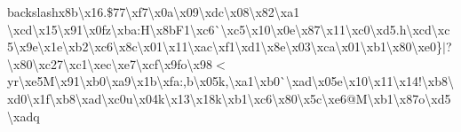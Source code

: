 \begin{DoxyCompactItemize}
backslash{}x8b\textbackslash{}x16.\$77\textbackslash{}xf7\textbackslash{}x0a\textbackslash{}x09\textbackslash{}xdc\textbackslash{}x08\textbackslash{}x82\textbackslash{}xa1 \textbackslash{}xcd\textbackslash{}x15\textbackslash{}x91\textbackslash{}x0fz\textbackslash{}xba\+:\+H\textbackslash{}x8b\+F1\textbackslash{}xc6\`{}\textbackslash{}xc5\textbackslash{}x10\textbackslash{}x0e\textbackslash{}x87\textbackslash{}x11\textbackslash{}xc0\textbackslash{}xd5.\+h\textbackslash{}xcd\textbackslash{}xc5\textbackslash{}x9e\textbackslash{}x1e\textbackslash{}xb2\textbackslash{}xc6\textbackslash{}x8c\textbackslash{}x01\textbackslash{}x11\textbackslash{}xac\textbackslash{}xf1\textbackslash{}xd1\textbackslash{}x8e\textbackslash{}x03\textbackslash{}xca\textbackslash{}x01\textbackslash{}xb1\textbackslash{}x80\textbackslash{}xe0\textquotesingle{}\}$\vert$?\textbackslash{}x80\textbackslash{}xc27\textbackslash{}xc1\textbackslash{}xec\textbackslash{}xe7\textbackslash{}xcf\textbackslash{}x9fo\textbackslash{}x98$<$yr\textbackslash{}xe5\+M\textbackslash{}x91\textbackslash{}xb0\textbackslash{}xa9\textbackslash{}x1b\textbackslash{}xfa\+:,b\textbackslash{}x05k,\textbackslash{}xa1\textbackslash{}xb0\`{}\textbackslash{}xad\textbackslash{}x05e\textbackslash{}x10\textbackslash{}x11\textbackslash{}x14!\textbackslash{}xb8\textbackslash{}xd0\textbackslash{}x1f\textbackslash{}xb8\textbackslash{}xad\textbackslash{}xc0u\textbackslash{}x04k\textbackslash{}x13\textbackslash{}x18k\textbackslash{}xb1\textbackslash{}xc6\textbackslash{}x80\textbackslash{}x5c\textbackslash{}xe6@\+M\textbackslash{}xb1\textbackslash{}x87o\textbackslash{}xd5\textbackslash{}xadq 
\end{DoxyCompactItemize}
